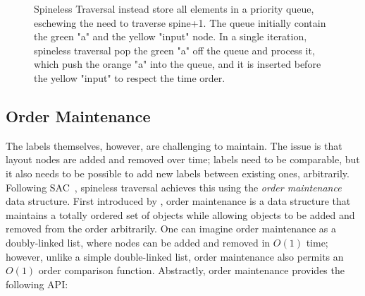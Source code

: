 \begin{figure}
\centering
\caption{Spineless Traversal instead store all elements in a priority queue, eschewing the need to traverse spine+1. The queue initially contain the green "a" and the yellow "input" node. In a single iteration, spineless traversal pop the green "a" off the queue and process it, which push the orange "a" into the queue, and it is inserted before the yellow "input" to respect the time order.}
\label{fig:dom-tree-pq}
\end{figure}

\subsection{Order Maintenance}

The labels themselves, however, are challenging to maintain.
The issue is that layout nodes are added and removed over time;
  labels need to be comparable,
  but it also needs to be possible
  to add new labels between existing ones,
  arbitrarily.
Following SAC~\cite{SAC},
  spineless traversal achieves this using
  the \emph{order maintenance} data structure.
First introduced by \citet{OM},
  order maintenance is a data structure
  that maintains a totally ordered set of objects
  while allowing objects
  to be added and removed from the order arbitrarily.
One can imagine order maintenance as a doubly-linked list,
  where nodes can be added and removed in $O(1)$ time;
  however, unlike a simple double-linked list,
  order maintenance also permits an $O(1)$ order comparison function.
Abstractly, order maintenance provides the following API:

